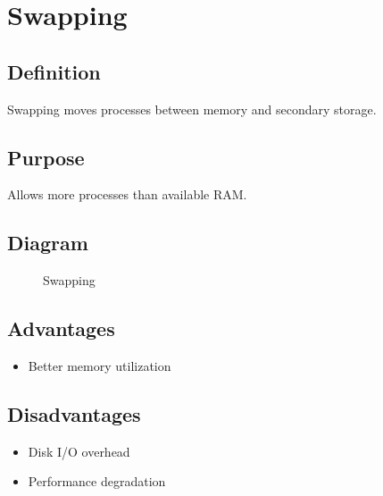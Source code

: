 \section{Swapping}

\subsection{Definition}

Swapping moves processes between memory and secondary storage.

\subsection{Purpose}

Allows more processes than available RAM.

\subsection{Diagram}

\begin{figure}[H]
\centering
{}
\caption{Swapping}
\end{figure}

\subsection{Advantages}

\begin{itemize}
\item Better memory utilization
\end{itemize}

\subsection{Disadvantages}

\begin{itemize}
\item Disk I/O overhead
\item Performance degradation
\end{itemize}


